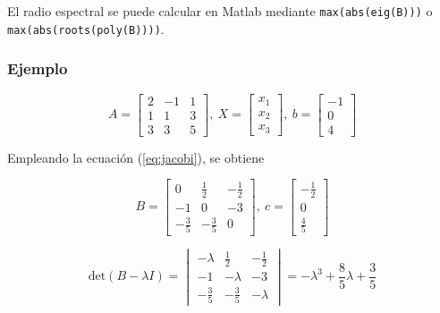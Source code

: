 \documentclass{article}
\begin{document}
El radio espectral se puede calcular en Matlab mediante \verb|max(abs(eig(B)))| o \verb|max(abs(roots(poly(B))))|.

\subsubsection{Ejemplo}

\begin{equation*}
    A =
    \begin{bmatrix}
        2 & -1 & 1 \\
        1 &  1 & 3 \\
        3 &  3 & 5
    \end{bmatrix},\ 
    X =
    \begin{bmatrix}
        x_1 \\ x_2 \\ x_3
    \end{bmatrix},\ 
    b =
    \begin{bmatrix}
        -1 \\ 0 \\ 4
    \end{bmatrix}
\end{equation*}

Empleando la ecuación (\ref{eq:jacobi}), se obtiene

\begin{equation*}
    B =
    \begin{bmatrix}
        0 & \frac{1}{2} & -\frac{1}{2} \\
        -1 & 0 & -3 \\
        -\frac{3}{5} & -\frac{3}{5} & 0
    \end{bmatrix},\ 
    c =
    \begin{bmatrix}
        -\frac{1}{2} \\ 0 \\ \frac{4}{5}
    \end{bmatrix}
\end{equation*}

\begin{equation*}
    \text{det}(B-\lambda I) =
    \begin{vmatrix}
        -\lambda & \frac{1}{2} & -\frac{1}{2} \\
        -1 & -\lambda & -3 \\
        -\frac{3}{5} & -\frac{3}{5} & -\lambda
    \end{vmatrix}
    = -\lambda^3 + \frac{8}{5}\lambda + \frac{3}{5}
\end{equation*}
\end{document}
